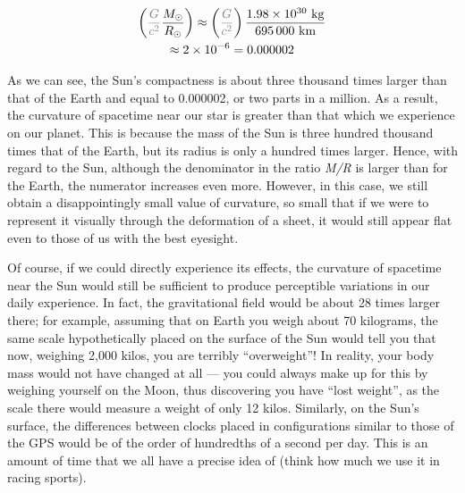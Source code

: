 \begin{equation}\label{eq:04-03}
\begin{gathered}
\left(\textcolor{gray}{\frac{G}{c^{2}}}\frac{M_{\odot}}{R_{\odot}}\right)
\approx \left(\textcolor{gray}{\frac{G}{c^{2}}}\right)\frac{1.98\times 10^{30}\ \mathrm{kg}}{695\,000\ \mathrm{km}} \\
\approx 2\times 10^{-6}=0.000002
\end{gathered}
\end{equation}


As we can see, the Sun's compactness is about three thousand times
larger than that of the Earth and equal to 0.000002, or two parts in a million. As a
result, the curvature of spacetime near our star is greater than that which we
experience on our planet. This is because the mass of the Sun is three hundred thousand
times that of the Earth, but its radius is only a hundred times larger. Hence, with
regard to the Sun, although the denominator in the ratio \emph{M/R} is larger than for
the Earth, the numerator increases even more. However, in this case, we still obtain a
disappointingly small value of curvature, so small that if we were to represent it
visually through the deformation of a sheet, it would still appear flat even to those of
us with the best eyesight.

Of course, if we could directly experience its effects, the curvature of spacetime near
the Sun would still be sufficient to produce perceptible variations in our daily
experience. In fact, the gravitational field would be about 28 times larger there; for
example, assuming that on Earth you weigh about 70 kilograms, the same scale
hypothetically placed on the surface of the Sun would tell you that now, weighing 2,000
kilos, you are terribly ``overweight''! In reality, your body mass would not have
changed at all --- you could always make up for this by weighing yourself on the
Moon, thus discovering you have ``lost weight'', as the scale there
would measure a weight of only 12 kilos. Similarly, on the Sun's surface, the
differences between clocks placed in configurations similar to those of the GPS would be
of the order of hundredths of a second per day. This is an amount of time that we all
have a precise idea of (think how much we use it in racing sports).

